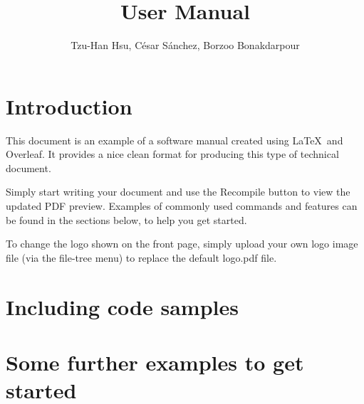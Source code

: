 \documentclass{ol-softwaremanual}
\title{\vspace{4cm} User Manual}
\author{Tzu-Han Hsu, César Sánchez, Borzoo Bonakdarpour
	\vspace{2mm}}
\begin{document}
\maketitle

\tableofcontents
\newpage

\section{Introduction}

This document is an example of a software manual created using \LaTeX\ and Overleaf. It provides a nice clean format for producing this type of technical document. 

Simply start writing your document and use the Recompile button to view the updated PDF preview. Examples of commonly used commands and features can be found in the sections below, to help you get started.

To change the logo shown on the front page, simply upload your own logo image file (via the file-tree menu) to replace the default logo.pdf file. 

%

\section{Including code samples}

%

\section{Some further examples to get started}

%
\end{document}
